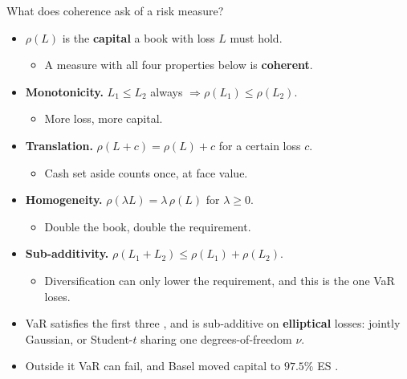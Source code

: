\documentclass[9pt, aspectratio=169, t]{beamer}
\begin{document}
\begin{frame}{What does coherence ask of a risk measure?}
  \begin{itemize}
    \item $\rho(L)$ is the \textbf{capital} a book with loss $L$ must hold.
      \begin{itemize}
        \item A measure with all four properties below is \textbf{coherent}.
      \end{itemize}
    \item \textbf{Monotonicity.} $L_{1} \le L_{2}$ always
          $\Rightarrow \rho(L_{1}) \le \rho(L_{2})$.
      \begin{itemize}
        \item More loss, more capital.
      \end{itemize}
    \item \textbf{Translation.} $\rho(L + c) = \rho(L) + c$ for a certain loss $c$.
      \begin{itemize}
        \item Cash set aside counts once, at face value.
      \end{itemize}
    \item \textbf{Homogeneity.} $\rho(\lambda L) = \lambda\,\rho(L)$ for
          $\lambda \ge 0$.
      \begin{itemize}
        \item Double the book, double the requirement.
      \end{itemize}
    \item \textbf{Sub-additivity.} $\rho(L_{1} + L_{2}) \le \rho(L_{1}) + \rho(L_{2})$.
      \begin{itemize}
        \item Diversification can only lower the requirement, and this is the one
              VaR loses.
      \end{itemize}
  \end{itemize}
  \vspace{0.3em}
  \begin{block}{}
    \begin{itemize}
      \item VaR satisfies the first three \parencite{artzner1999coherent}, and is
            sub-additive on \textbf{elliptical} losses: jointly Gaussian, or
            Student-$t$ sharing one degrees-of-freedom $\nu$.
      \item Outside it VaR can fail, and Basel moved capital to $97.5\%$ ES
            \parencite{bcbs2019frtb}.
    \end{itemize}
  \end{block}
\end{frame}
\end{document}
